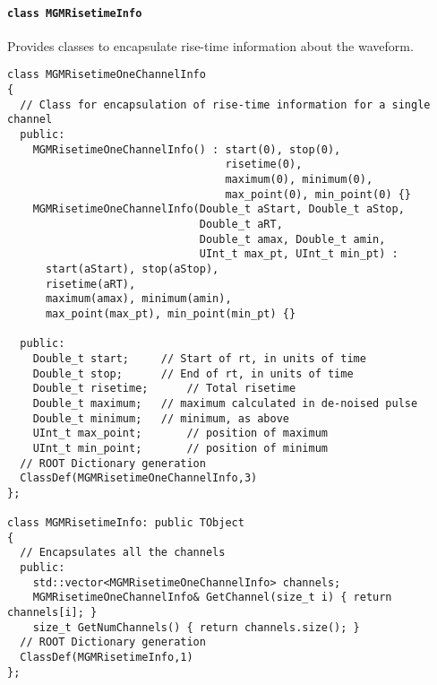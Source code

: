 				\paragraph{\lstinline!class MGMRisetimeInfo!}
Provides classes to encapsulate rise-time information about the waveform.
					\begin{lstlisting}
class MGMRisetimeOneChannelInfo
{
  // Class for encapsulation of rise-time information for a single channel
  public:
    MGMRisetimeOneChannelInfo() : start(0), stop(0), 
                                  risetime(0), 
                                  maximum(0), minimum(0),
                                  max_point(0), min_point(0) {}
    MGMRisetimeOneChannelInfo(Double_t aStart, Double_t aStop, 
                              Double_t aRT, 
                              Double_t amax, Double_t amin, 
                              UInt_t max_pt, UInt_t min_pt) : 
      start(aStart), stop(aStop), 
      risetime(aRT),
      maximum(amax), minimum(amin), 
      max_point(max_pt), min_point(min_pt) {}

  public:
    Double_t start;		// Start of rt, in units of time
    Double_t stop;		// End of rt, in units of time
    Double_t risetime;		// Total risetime
    Double_t maximum;	// maximum calculated in de-noised pulse
    Double_t minimum;	// minimum, as above
    UInt_t max_point;		// position of maximum
    UInt_t min_point;		// position of minimum
  // ROOT Dictionary generation
  ClassDef(MGMRisetimeOneChannelInfo,3)
};

class MGMRisetimeInfo: public TObject
{
  // Encapsulates all the channels
  public:
    std::vector<MGMRisetimeOneChannelInfo> channels;
    MGMRisetimeOneChannelInfo& GetChannel(size_t i) { return channels[i]; } 
    size_t GetNumChannels() { return channels.size(); }
  // ROOT Dictionary generation    
  ClassDef(MGMRisetimeInfo,1)
};
					\end{lstlisting}	
